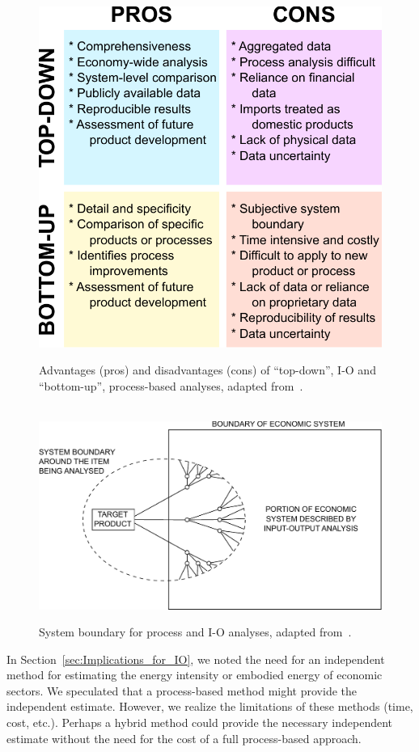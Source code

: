 \begin{figure}[p]
\centering\
\includegraphics[width=0.8\linewidth]{Part_3/Chapter_Unfinished/images/Top_down_vs_bottom_up.pdf}
\caption[Top-down vs.\ bottom-up analyses ]{Advantages (pros) and disadvantages (cons) of ``top-down'', I-O and ``bottom-up'', process-based analyses, adapted from~\cite{Hendrickson2006}.}
\label{fig:IO_vs_process}
\end{figure}

\begin{figure}[p]
\centering\
\includegraphics[width=\linewidth]{Part_3/Chapter_Unfinished/images/Hybrid_boundary.pdf}
\caption[System boundary for process and I-O analyses]{System boundary for process and I-O analyses, adapted from~\cite{Bullard:1978vd}.}
\label{fig:Hybrid_boundary}
\end{figure}


In Section~\ref{sec:Implications_for_IO},
we noted the need for an independent method
for estimating the energy intensity or embodied 
energy of economic sectors.
We speculated that a process-based method
might provide the independent estimate. 
However, we realize the limitations of these
methods (time, cost, etc.).
Perhaps a hybrid method could provide the necessary 
independent estimate without the need for the 
cost of a full process-based approach.




